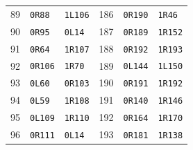 {\begin{longtable}{@{}rll@{\qquad\quad}rll@{}}
89 & \texttt{0R88} & \texttt{1L106} & 186 & \texttt{0R190} & \texttt{1R46}\\
90 & \texttt{0R95} & \texttt{0L14} & 187 & \texttt{0R189} & \texttt{1R152}\\
91 & \texttt{0R64} & \texttt{1R107} & 188 & \texttt{0R192} & \texttt{1R193}\\
92 & \texttt{0R106} & \texttt{1R70} & 189 & \texttt{0L144} & \texttt{1L150}\\
93 & \texttt{0L60} & \texttt{0R103} & 190 & \texttt{0R191} & \texttt{1R192}\\
94 & \texttt{0L59} & \texttt{1R108} & 191 & \texttt{0R140} & \texttt{1R146}\\
95 & \texttt{0L109} & \texttt{1R110} & 192 & \texttt{0R164} & \texttt{1R170}\\
96 & \texttt{0R111} & \texttt{0L14} & 193 & \texttt{0R181} & \texttt{1R138}\\
\bottomrule\end{longtable}
}
